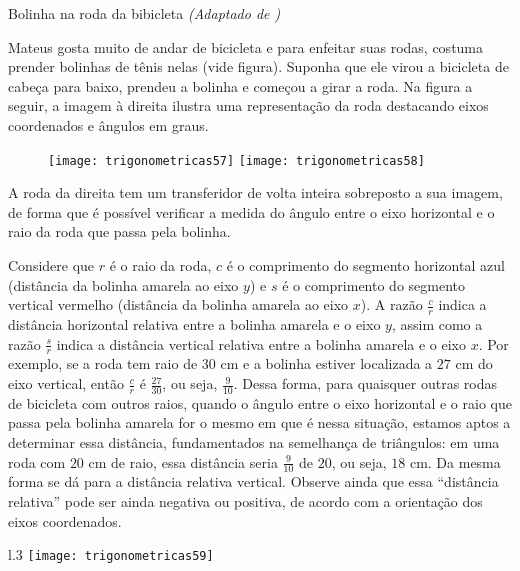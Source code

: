 \begin{task}{Bolinha na roda da bibicleta}
\label{trig-ativ16}
\textit{(Adaptado de \cite{costa2017})}

Mateus gosta muito de andar de bicicleta e para enfeitar suas rodas, costuma prender bolinhas de tênis nelas (vide figura). Suponha que ele virou a bicicleta de cabeça para baixo, prendeu a bolinha e começou a girar a roda. Na figura a seguir, a imagem à direita ilustra uma representação da roda destacando eixos coordenados e ângulos em graus.

\begin{figure}[H]
\centering

\texttt{[image: trigonometricas57]}
\texttt{[image: trigonometricas58]}
\end{figure}


A roda da direita tem um transferidor de volta inteira sobreposto a sua imagem, de forma que é possível verificar a medida do ângulo entre o eixo horizontal e o raio da roda que passa pela bolinha.

Considere que $r$ é o raio da roda, $c$ é o comprimento do segmento horizontal azul (distância da bolinha amarela ao eixo $y$) e $s$ é o comprimento do segmento vertical vermelho (distância da bolinha amarela ao eixo $x$). A razão $\frac{c}{r}$ indica a distância horizontal relativa entre a bolinha amarela e o eixo $y$, assim como a razão $\frac{s}{r}$ indica a distância vertical relativa entre a bolinha amarela e o eixo $x$. Por exemplo, se a roda tem raio de $30$ cm e a bolinha estiver localizada a $27$ cm do eixo vertical, então $\frac{c}{r}$ é $\frac{27}{30}$, ou seja, $\frac{9}{10}$. Dessa forma, para quaisquer outras rodas de bicicleta com outros raios, quando o ângulo entre o eixo horizontal e o raio que passa pela bolinha amarela for o mesmo em que é nessa situação, estamos aptos a determinar essa distância, fundamentados na semelhança de triângulos: em uma roda com $20$ cm de raio, essa distância seria $\frac{9}{10}$ de $20$, ou seja, $18$ cm. Da mesma forma se dá para a distância relativa vertical. Observe ainda que essa “distância relativa”{} pode ser ainda negativa ou positiva, de acordo com a orientação dos eixos coordenados.


\begin{wrapfigure}[8]{l}{.3\linewidth}
\vspace{-1em}
\texttt{[image: trigonometricas59]}
\end{wrapfigure}


\end{task}
